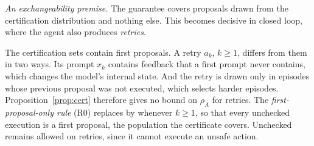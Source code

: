\emph{An exchangeability premise.} The guarantee covers proposals drawn from the certification distribution and
nothing else. This becomes decisive in closed loop, where the agent also produces \emph{retries}.

\begin{remark}\label{rem:retries}
The certification sets contain first proposals. A retry $a_k$, $k\ge1$, differs from them in two ways. Its prompt
$x_k$ contains feedback that a first prompt never contains, which changes the model's internal state. And the
retry is drawn only in episodes whose previous proposal was not executed, which selects harder episodes.
Proposition~\ref{prop:cert} therefore gives no bound on $\rho_A$ for retries. The \emph{first-proposal-only
rule} (R0) replaces \ACC{} by \VAL{} whenever $k\ge1$, so that every unchecked execution is a first proposal, the
population the certificate covers. Unchecked \REJ{} remains allowed on retries, since it cannot execute an
unsafe action.
\end{remark}

